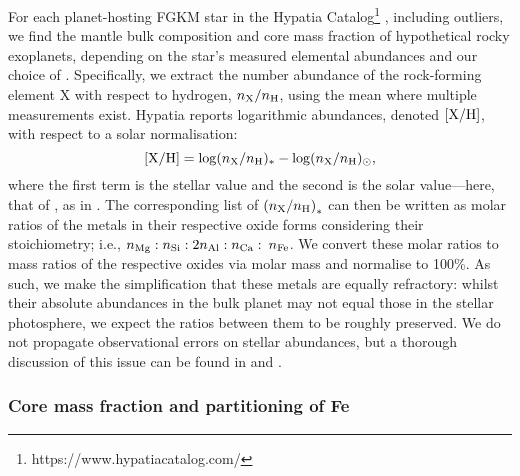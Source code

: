 For each planet-hosting FGKM star in the Hypatia Catalog\footnote{https://www.hypatiacatalog.com/} \citep{hinkel_stellar_2014}, including outliers, we find the mantle bulk composition and core mass fraction of hypothetical rocky exoplanets, depending on the star's measured elemental abundances and our choice of \coreeff. Specifically, we extract the number abundance of the rock-forming element X with respect to hydrogen, $n_{\rm X}/n_{\rm H}$, using the mean where multiple measurements exist. Hypatia reports logarithmic abundances, denoted ${\rm [X/H]}$, with respect to a solar normalisation:
\begin{equation}
    {\rm [X/H]} = \log(n_{\rm X}/n_{\rm H})_* - \log(n_{\rm X}/n_{\rm H})_{\odot},
\end{equation}
where the first term is the stellar value and the second is the solar value---here, that of \citet{lodders_abundances_2009}, as in \citet{hinkel_star_2018}. The corresponding list of $\left(n_{\rm X}/n_{\rm H}\right)_*$ can then be written as molar ratios of the metals in their respective oxide forms considering their stoichiometry; i.e., $n_{\rm Mg}:n_{\rm Si}:2n_{\rm Al}:n_{\rm Ca}:$ \coreeff$n_{\rm Fe}$. We convert these molar ratios to mass ratios of the respective oxides via molar mass and normalise to 100\%. As such, we make the simplification that these metals are equally refractory: whilst their absolute abundances in the bulk planet may not equal those in the stellar photosphere, we expect the ratios between them to be roughly preserved.  We do not propagate observational errors on stellar abundances, but a thorough discussion of this issue can be found in \citet{hinkel_star_2018} and \citet{hinkel_concise_2022}.

\subsubsection{Core mass fraction and partitioning of Fe}

